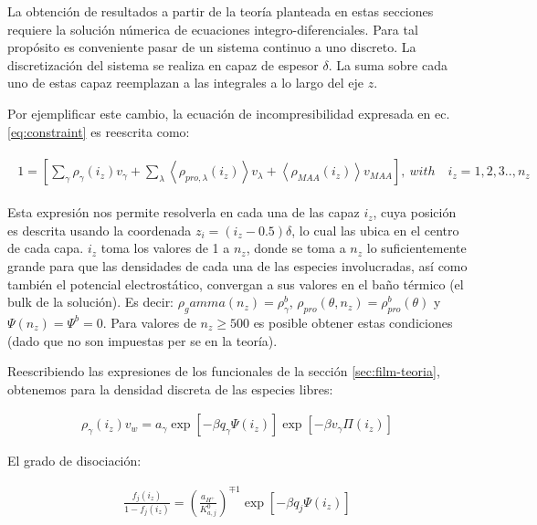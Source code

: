 La obtenci\'on de resultados a partir de la teor\'ia planteada en estas secciones requiere la soluci\'on n\'umerica de ecuaciones integro-diferenciales. Para tal prop\'osito es conveniente pasar de un sistema continuo a uno discreto. 
La discretizaci\'on del sistema se realiza en capaz de espesor $\delta$. La suma sobre cada uno de estas capaz reemplazan a las integrales a lo largo del eje $z$.

Por ejemplificar este cambio, la ecuaci\'on de incompresibilidad expresada en ec. \ref{eq:constraint} es reescrita como:


\begin{align}
	\begin{aligned}
		1=  {\left[\sum_{\gamma}\rho_\gamma(i_z) v_\gamma + \sum_\lambda{\left<\rho_{pro,\lambda}(i_z)\right>v_\lambda} + \left<\rho_{MAA}(i_z)\right>v_{MAA} \right]},~ with \quad  i_z =1,2,3.., n_z
	\end{aligned}
\label{eq:film:discreto-constraint}
\end{align}

Esta expresi\'on nos permite resolverla en cada una de las capaz $i_z$, cuya posición es descrita usando la coordenada $z_i = (i_z -0.5)\delta$, lo cual las ubica en el centro de cada capa. $i_z$ toma los valores de 1 a $n_z$, donde se toma a $n_z$ lo suficientemente grande para que las densidades de cada una de las especies involucradas, as\'i como tambi\'en el potencial electrost\'atico, convergan a sus valores en el ba\~no t\'ermico (el bulk de la soluci\'on).
Es decir: $\rho_gamma(n_z) = \rho^b_\gamma$, $\rho_{pro}(\theta,n_z) = \rho^b_{pro}(\theta)$ y $\Psi(n_z) = \Psi^b =0$.
Para valores de $n_z \geq 500$ es posible obtener estas condiciones (dado que no son impuestas per se en la teor\'ia).

Reescribiendo las expresiones de los funcionales de la secci\'on \ref{sec:film-teoria}, obtenemos para la densidad discreta de las especies libres:

\begin{align}
	\rho_\gamma(i_z)v_w = a_\gamma \exp\left[-\beta q_\gamma\Psi(i_z)\right] \exp\left[-\beta v_\gamma\Pi(i_z)\right]
\end{align}


El grado de disociaci\'on:

\begin{align}
	\frac{f_j(i_z)}{1-f_j(i_z)} = \left(\frac{a_{H^+}}{K^0_{a,j}}\right)^{\mp 1} \exp[-\beta q_j \Psi(i_z)]
\end{align}

